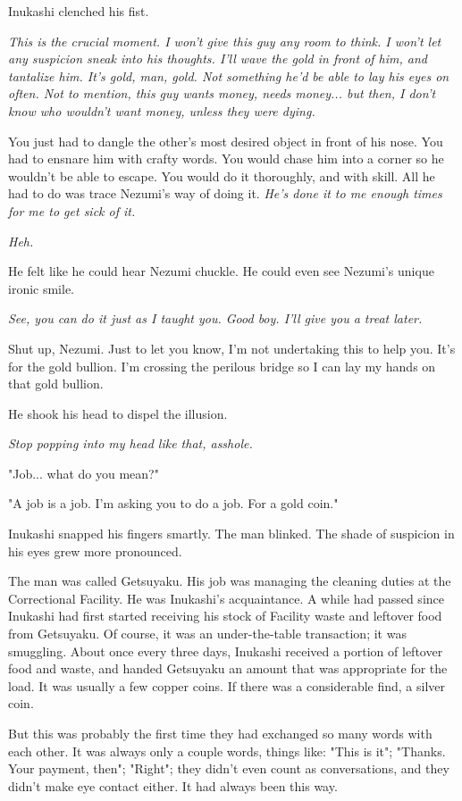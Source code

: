 Inukashi clenched his fist.

\emph{This is the crucial moment. I won't give this guy any room to think. I
	won't let any suspicion sneak into his thoughts. I'll wave the gold in
	front of him, and tantalize him. It's gold, man, gold. Not something
	he'd be able to lay his eyes on often. Not to mention, this guy wants
	money, \emph{needs} money... but then, I don't know who \emph{wouldn't} want money,
	unless they were dying.}

You just had to dangle the other's most desired object in front of his
nose. You had to ensnare him with crafty words. You would chase him into
a corner so he wouldn't be able to escape. You would do it thoroughly,
and with skill. All he had to do was trace Nezumi's way of doing it.
\emph{He's done it to me enough times for me to get sick of it.}

\emph{Heh.}

He felt like he could hear Nezumi chuckle. He could even see Nezumi's
unique ironic smile.

\emph{See, you \emph{can} do it just as I taught you. Good boy. I'll give you a treat
	later.}

Shut up, Nezumi. Just to let you know, I'm not undertaking this to help
you. It's for the gold bullion. I'm crossing the perilous bridge so I
can lay my hands on that gold bullion.

He shook his head to dispel the illusion.

\emph{Stop popping into my head like that, asshole.}

"Job... what do you mean?"

"A job is a job. I'm asking you to do a job. For a gold coin."

Inukashi snapped his fingers smartly. The man blinked. The shade of
suspicion in his eyes grew more pronounced.

The man was called Getsuyaku. His job was managing the cleaning duties
at the Correctional Facility. He was Inukashi's acquaintance. A while
had passed since Inukashi had first started receiving his stock of
Facility waste and leftover food from Getsuyaku. Of course, it was an
under-the-table transaction; it was smuggling. About once every three
days, Inukashi received a portion of leftover food and waste, and handed
Getsuyaku an amount that was appropriate for the load. It was usually a
few copper coins. If there was a considerable find, a silver coin.

But this was probably the first time they had exchanged so many words
with each other. It was always only a couple words, things like: "This
is it"; "Thanks. Your payment, then"; "Right"; they didn't even count as
conversations, and they didn't make eye contact either. It had always
been this way.

